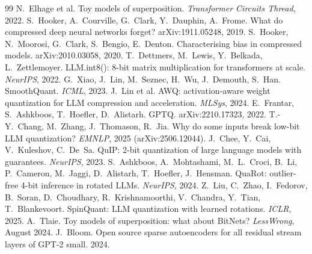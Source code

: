 \documentclass{article}
\begin{document}
\clearpage
\begin{thebibliography}{99}\small
{} N.~Elhage et al. Toy models of superposition. \emph{Transformer Circuits Thread}, 2022.
 S.~Hooker, A.~Courville, G.~Clark, Y.~Dauphin, A.~Frome. What do compressed deep neural networks forget? arXiv:1911.05248, 2019.
 S.~Hooker, N.~Moorosi, G.~Clark, S.~Bengio, E.~Denton. Characterising bias in compressed models. arXiv:2010.03058, 2020.
 T.~Dettmers, M.~Lewis, Y.~Belkada, L.~Zettlemoyer. LLM.int8(): 8-bit matrix multiplication for transformers at scale. \emph{NeurIPS}, 2022.
 G.~Xiao, J.~Lin, M.~Seznec, H.~Wu, J.~Demouth, S.~Han. SmoothQuant. \emph{ICML}, 2023.
 J.~Lin et al. AWQ: activation-aware weight quantization for LLM compression and acceleration. \emph{MLSys}, 2024.
 E.~Frantar, S.~Ashkboos, T.~Hoefler, D.~Alistarh. GPTQ. arXiv:2210.17323, 2022.
 T.-Y.~Chang, M.~Zhang, J.~Thomason, R.~Jia. Why do some inputs break low-bit LLM quantization? \emph{EMNLP}, 2025 (arXiv:2506.12044).
 J.~Chee, Y.~Cai, V.~Kuleshov, C.~De~Sa. QuIP: 2-bit quantization of large language models with guarantees. \emph{NeurIPS}, 2023.
 S.~Ashkboos, A.~Mohtashami, M.~L.~Croci, B.~Li, P.~Cameron, M.~Jaggi, D.~Alistarh, T.~Hoefler, J.~Hensman. QuaRot: outlier-free 4-bit inference in rotated LLMs. \emph{NeurIPS}, 2024.
 Z.~Liu, C.~Zhao, I.~Fedorov, B.~Soran, D.~Choudhary, R.~Krishnamoorthi, V.~Chandra, Y.~Tian, T.~Blankevoort. SpinQuant: LLM quantization with learned rotations. \emph{ICLR}, 2025.
 A.~Tlaie. Toy models of superposition: what about BitNets? \emph{LessWrong}, August 2024.
 J.~Bloom. Open source sparse autoencoders for all residual stream layers of GPT-2 small. 2024.
\end{thebibliography}
\end{document}
